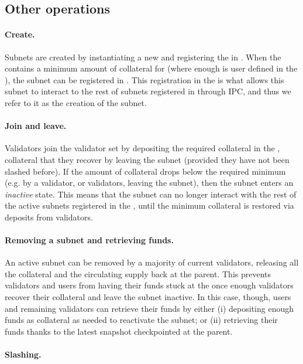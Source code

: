 \subsection{Other operations}
\paragraph{Create.} Subnets are created by instantiating a new \sa and registering the \sa in \gw. When the \gw contains a minimum amount of collateral for \sa (where enough is user defined in the \sa {}), the subnet can be registered in \gw. This registration in the \gw is what allows this subnet to interact to the rest of subnets registered in \gw through IPC, and thus we refer to it as the creation of the subnet. 
\paragraph{Join and leave.} Validators join the validator set by depositing the required collateral in the \gw, collateral that they recover by leaving the subnet (provided they have not been slashed before). If the amount of collateral drops below the required minimum (e.g. by a validator, or validators, leaving the subnet), then the subnet enters an \emph{inactive} state. This means that the subnet can no longer interact with the rest of the active subnets registered in the \gw, until the minimum collateral is restored via deposits from validators.
\paragraph{Removing a subnet and retrieving funds.} An active subnet can be removed by a majority of current validators, releasing all the collateral and the circulating supply back at the parent. This prevents validators and users from having their funds stuck at the \gw once enough validators recover their collateral and leave the subnet inactive. In this case, though, users and remaining validators can retrieve their funds by either (i) depositing enough funds as collateral as needed to reactivate the subnet; or (ii) retrieving their funds thanks to the latest snapshot checkpointed at the parent. 
\paragraph{Slashing.}


